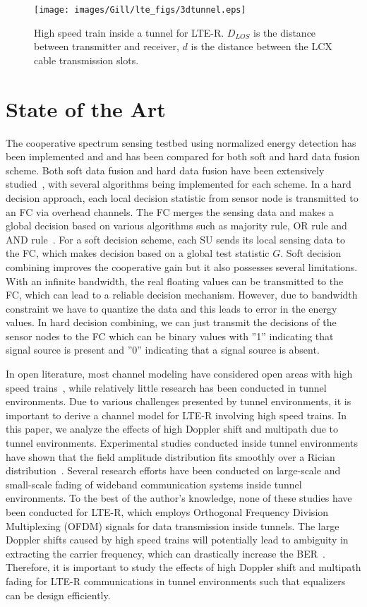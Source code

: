 \begin{figure}[t]
\label{fig:2}
\centering
\texttt{[image: images/Gill/lte\_figs/3dtunnel.eps]} 
\caption{High speed train inside a tunnel for LTE-R. $D_{LOS}$ is the distance between transmitter and receiver, $d$ is the distance between the LCX cable transmission slots.}
\end{figure}

\section{State of the Art}
The cooperative spectrum sensing testbed using normalized energy detection has been implemented and and has been compared for both soft and hard data fusion scheme. Both soft data fusion and hard data fusion have been extensively studied~\cite{arhtn9,inphtn10,arhtn11}, with several algorithms being implemented for each scheme. In a hard decision approach, each local decision statistic from sensor node is transmitted to an FC via overhead channels. The FC merges the sensing data and makes a global decision based on various algorithms such as majority rule, OR rule and AND rule~\cite{inhtn12}. For a soft decision scheme, each SU sends its local sensing data to the FC, which makes decision based on a global test statistic $G$. Soft decision combining improves the cooperative gain but it also possesses several limitations. With an infinite bandwidth, the real floating values can be transmitted to the FC, which can lead to a reliable decision mechanism. However, due to bandwidth constraint we have to quantize the data and this leads to error in the energy values. In hard decision combining, we can just transmit the decisions of the sensor nodes to the FC which can be binary values with ”1” indicating that signal source is present and ”0” indicating that a signal source is absent.

In open literature, most channel modeling have considered open areas with high speed trains~\cite{inplter5,inplter6}, while relatively little research has been conducted in tunnel environments. Due to various challenges presented by tunnel environments, it is important to derive a channel model for LTE-R involving high speed trains. In this paper, we analyze the effects of high Doppler shift and multipath due to tunnel environments. Experimental studies conducted inside tunnel environments have shown that the field amplitude distribution fits smoothly over a Rician distribution~\cite{inplter8}. Several research efforts have been conducted on large-scale and small-scale fading of wideband communication systems inside tunnel environments. To the best of the author’s knowledge, none of these studies have been conducted for LTE-R, which employs Orthogonal Frequency Division Multiplexing (OFDM) signals for data transmission inside tunnels. The large Doppler shifts caused by high speed trains will potentially lead to ambiguity in extracting the carrier frequency, which can drastically increase the BER~\cite{inplter9}. Therefore, it is important to study the effects of high Doppler shift and multipath fading for LTE-R communications in tunnel environments such that equalizers can be design efficiently.
